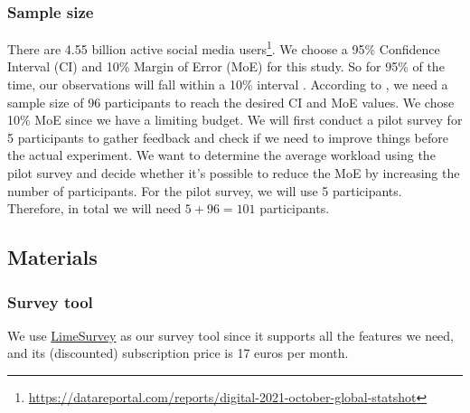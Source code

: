 \documentclass[a4paper]{article}
\begin{document}
\subsubsection{Sample size}
There are 4.55 billion active social media users\footnote{\url{https://datareportal.com/reports/digital-2021-october-global-statshot}}. We choose a 95\% Confidence Interval (CI) and 10\% Margin of Error (MoE) for this study. So for 95\% of the time, our observations will fall within a 10\% interval \cite{olson2014ways}. According to \cite{olson2014ways}, we need a sample size of 96 participants to reach the desired CI and MoE values. We chose 10\% MoE since we have a limiting budget. We will first conduct a pilot survey for 5 participants to gather feedback and check if we need to improve things before the actual experiment. We want to determine the average workload using the pilot survey and decide whether it’s possible to reduce the MoE by increasing the number of participants. For the pilot survey, we will use 5 participants. Therefore, in total we will need $5+96 = 101$ participants.

\subsection{Materials}
\subsubsection{Survey tool}
We use \href{https://www.limesurvey.org}{LimeSurvey} as our survey tool since it supports all the features we need, and its (discounted) subscription price is 17 euros per month.
\end{document}
